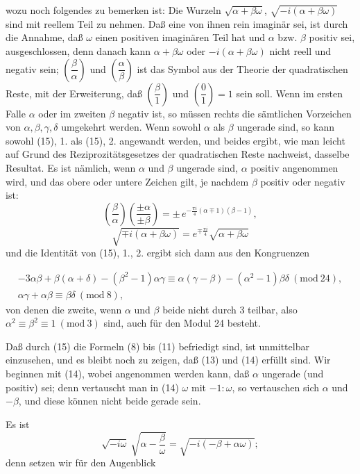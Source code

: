 wozu noch folgendes zu bemerken ist: Die Wurzeln $\sqrt{\alpha+\beta\omega}$,
$\sqrt{-i(\alpha+\beta\omega)}$ sind mit  reellem Teil zu nehmen.
Daß eine von ihnen rein imaginär sei, ist durch die Annahme, daß $\omega$
einen positiven imaginären Teil hat und $\alpha$ bzw. $\beta$ positiv sei,
ausgeschlossen, denn danach kann $\alpha+\beta\omega$ oder $-i(\alpha+\beta\omega)$
nicht reell und negativ sein; $\left(\dfrac{\beta}{\alpha}\right)$ und
$\left(\dfrac{\alpha}{\beta}\right)$ ist das  Symbol
aus der Theorie der quadratischen Reste, mit der Erweiterung, daß
$\left(\dfrac{\beta}{1}\right)$ und $\left(\dfrac{0}{1}\right)=1$ sein soll. Wenn
im ersten Falle $\alpha$ oder im zweiten $\beta$ negativ ist, so müssen rechts
die sämtlichen Vorzeichen von $\alpha, \beta, \gamma, \delta$ umgekehrt werden.
Wenn sowohl $\alpha$ als $\beta$ ungerade sind, so kann sowohl (15), 1. als (15), 2.
angewandt werden, und beides ergibt, wie man leicht auf Grund
des Reziprozitätsgesetzes der quadratischen Reste nachweist, dasselbe
 Resultat. Es ist nämlich, wenn $\alpha$ und $\beta$ ungerade sind,
$\alpha$ positiv angenommen wird, und das obere oder untere Zeichen
gilt, je nachdem $\beta$ positiv oder negativ ist:
\[
\left(\frac{\beta}{\alpha}\right)\left(\frac{\pm\alpha}{\pm\beta}\right)
= \pm\, e^{-\frac{\pi i}{4}(\alpha\mp1)(\beta-1)},
\]
\[
\sqrt{\mp i(\alpha+\beta\omega)} = e^{\mp\frac{\pi i}{4}}\sqrt{\alpha+\beta\omega}
\]
und die Identität von (15), 1., 2. ergibt sich dann aus den Kongruenzen

\[
\begin{gathered}
-3\alpha\beta+\beta(\alpha+\delta)-(\beta^2-1)\alpha\gamma \equiv \alpha(\gamma-\beta)-(\alpha^2-1)\beta\delta \ (\mathrm{mod}\ 24), \\
\alpha\gamma+\alpha\beta \equiv \beta\delta \ (\mathrm{mod}\ 8),
\end{gathered}
\]
von denen die zweite, wenn $\alpha$ und $\beta$ beide nicht durch 3 teilbar,
also $\alpha^2\equiv\beta^2\equiv1 \ (\mathrm{mod}\ 3)$ sind, auch für den Modul 24 besteht.

Daß durch (15) die Formeln (8) bis (11) befriedigt sind, ist
unmittelbar einzusehen, und es bleibt noch zu zeigen, daß (13)
und (14) erfüllt sind. Wir beginnen mit (14), wobei angenommen
werden kann, daß $\alpha$ ungerade (und positiv) sei; denn vertauscht
man in (14) $\omega$ mit $-1:\omega$, so vertauschen sich $\alpha$ und $-\beta$, und
diese können nicht beide gerade sein.

Es ist
\[
\sqrt{-i\omega}\ \sqrt{\alpha-\frac{\beta}{\omega}} = \sqrt{-i(-\beta+\alpha\omega)};
\]
denn setzen wir für den Augenblick
